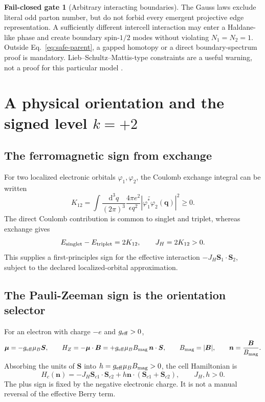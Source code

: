 \documentclass[11pt]{article}
\theoremstyle{definition}
\newtheorem{gate}[theorem]{Fail-closed gate}
\theoremstyle{remark}
\newcommand{\dd}{\mathrm d}
\begin{document}
\begin{gate}[Arbitrary interacting boundaries]
The Gauss laws exclude literal odd parton number, but do not forbid every
emergent projective edge representation.  A sufficiently different
intercell interaction may enter a Haldane-like phase and create boundary
spin-\(1/2\) modes without violating \(N_1=N_2=1\).  Outside
Eq.~\eqref{eq:safe-parent}, a gapped homotopy or a direct boundary-spectrum
proof is mandatory.  Lieb--Schultz--Mattis-type constraints are a useful
warning, not a proof for this particular model \cite{YaoEtAl2024}.
\end{gate}

\section{A physical orientation and the signed level \texorpdfstring{\(k=+2\)}{k=+2}}

\subsection{The ferromagnetic sign from exchange}

For two localized electronic orbitals \(\varphi_1,\varphi_2\), the Coulomb
exchange integral can be written
\begin{equation}
 K_{12}=\int\frac{\dd^3q}{(2\pi)^3}
 \frac{4\pi e^2}{\epsilon q^2}
 \left|\widetilde{\varphi_1^*\varphi_2}(\bm q)\right|^2\ge0.
 \label{eq:exchange-integral}
\end{equation}
The direct Coulomb contribution is common to singlet and triplet, whereas
exchange gives
\begin{equation}
 E_{\rm singlet}-E_{\rm triplet}=2K_{12},\qquad J_H=2K_{12}>0.
 \label{eq:hund-sign}
\end{equation}
This supplies a first-principles sign for the effective interaction
\(-J_H\bm S_1\cdot\bm S_2\), subject to the declared localized-orbital
approximation.

\subsection{The Pauli-Zeeman sign is the orientation selector}

For an electron with charge \(-e\) and \(g_{\rm eff}>0\),
\begin{equation}
 \bm\mu=-g_{\rm eff}\mu_B\bm S,
 \qquad H_Z=-\bm\mu\cdot\bm B
 =+g_{\rm eff}\mu_BB_{\rm mag}\,\bm n\cdot\bm S,
 \qquad B_{\rm mag}=|\bm B|,\qquad
 \bm n=\frac{\bm B}{B_{\rm mag}}.
 \label{eq:pauli-sign}
\end{equation}
Absorbing the units of \(\bm S\) into
\(h=g_{\rm eff}\mu_BB_{\rm mag}>0\), the cell
Hamiltonian is
\begin{equation}
 H_c(\bm n)=-J_H\bm S_{c1}\cdot\bm S_{c2}
 +h\bm n\cdot(\bm S_{c1}+\bm S_{c2}),
 \qquad J_H,h>0.
 \label{eq:oriented-hamiltonian}
\end{equation}
The plus sign is fixed by the negative electronic charge.  It is not a manual
reversal of the effective Berry term.
\end{document}
